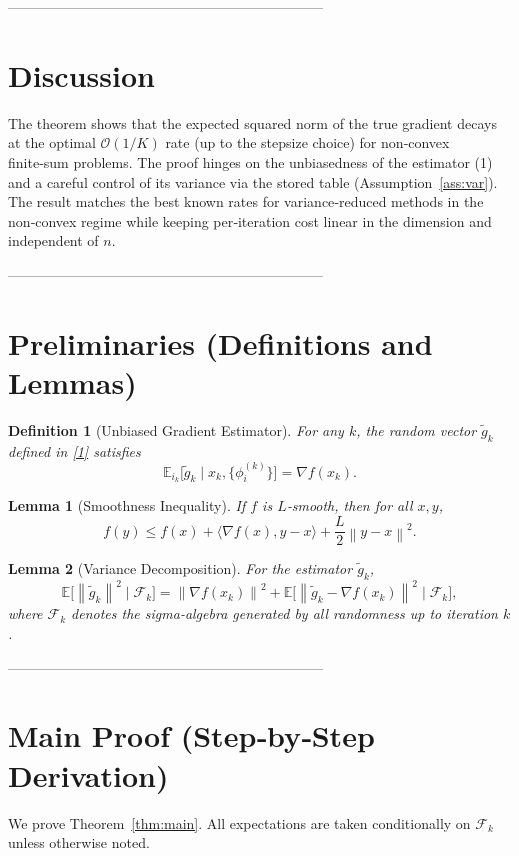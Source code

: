 \documentclass{article}
\newtheorem{lemma}{Lemma}
\newtheorem{definition}{Definition}
\newcommand{\E}{\mathbb{E}}
\newcommand{\norm}[1]{\left\|#1\right\|}
\newcommand{\grad}{\nabla}
\begin{document}
--------------------------------------------------------------------

\section*{Discussion}
The theorem shows that the expected squared norm of the true gradient decays at the optimal $\mathcal{O}(1/K)$ rate (up to the stepsize choice) for non‑convex finite‑sum problems. The proof hinges on the unbiasedness of the estimator (1) and a careful control of its variance via the stored table (Assumption~\ref{ass:var}). The result matches the best known rates for variance‑reduced methods in the non‑convex regime while keeping per‑iteration cost linear in the dimension and independent of $n$.

--------------------------------------------------------------------

\section*{Preliminaries (Definitions and Lemmas)}
\begin{definition}[Unbiased Gradient Estimator]
For any $k$, the random vector $\tilde g_k$ defined in \eqref{1} satisfies
\[
\E_{i_k}\!\bigl[\tilde g_k\mid x_k, \{\phi_i^{(k)}\}\bigr]=\grad f(x_k).
\tag{L1}
\]
\end{definition}
\begin{lemma}[Smoothness Inequality]\label{lem:smooth}
If $f$ is $L$‑smooth, then for all $x,y$,
\[
f(y)\le f(x)+\langle\grad f(x),y-x\rangle+\frac{L}{2}\norm{y-x}^{2}.
\tag{L2}
\]
\end{lemma}
\begin{lemma}[Variance Decomposition]\label{lem:var}
For the estimator $\tilde g_k$,
\[
\E\!\bigl[\norm{\tilde g_k}^{2}\mid\mathcal{F}_k\bigr]
= \norm{\grad f(x_k)}^{2}
   +\E\!\bigl[\norm{\tilde g_k-\grad f(x_k)}^{2}\mid\mathcal{F}_k\bigr],
\tag{L3}
\]
where $\mathcal{F}_k$ denotes the sigma‑algebra generated by all randomness up to iteration $k$.
\end{lemma}

--------------------------------------------------------------------

\section*{Main Proof (Step‑by‑Step Derivation)}
We prove Theorem~\ref{thm:main}.  All expectations are taken conditionally on $\mathcal{F}_k$ unless otherwise noted.
\end{document}
